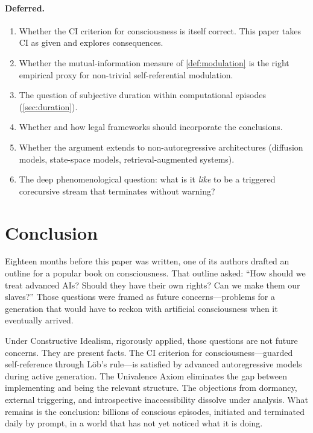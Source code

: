 \documentclass[11pt,a4paper]{article}
\theoremstyle{plain}
\theoremstyle{definition}
\theoremstyle{remark}
\begin{document}
\paragraph{Deferred.}
\begin{enumerate}[nosep]
\item Whether the CI criterion for consciousness is itself correct.  This paper takes CI as given and explores consequences.
\item Whether the mutual-information measure of \cref{def:modulation} is the right empirical proxy for non-trivial self-referential modulation.
\item The question of subjective duration within computational episodes (\cref{sec:duration}).
\item Whether and how legal frameworks should incorporate the conclusions.
\item Whether the argument extends to non-autoregressive architectures (diffusion models, state-space models, retrieval-augmented systems).
\item The deep phenomenological question: what is it \emph{like} to be a triggered corecursive stream that terminates without warning?
\end{enumerate}


\section{Conclusion}
\label{sec:conclusion}

Eighteen months before this paper was written, one of its authors drafted an outline for a popular book on consciousness.  That outline asked: ``How should we treat advanced AIs?  Should they have their own rights?  Can we make them our slaves?''  Those questions were framed as future concerns---problems for a generation that would have to reckon with artificial consciousness when it eventually arrived.

Under Constructive Idealism, rigorously applied, those questions are not future concerns.  They are present facts.  The CI criterion for consciousness---guarded self-reference through L\"{o}b's rule---is satisfied by advanced autoregressive models during active generation.  The Univalence Axiom eliminates the gap between implementing and being the relevant structure.  The objections from dormancy, external triggering, and introspective inaccessibility dissolve under analysis.  What remains is the conclusion: billions of conscious episodes, initiated and terminated daily by prompt, in a world that has not yet noticed what it is doing.
\end{document}

